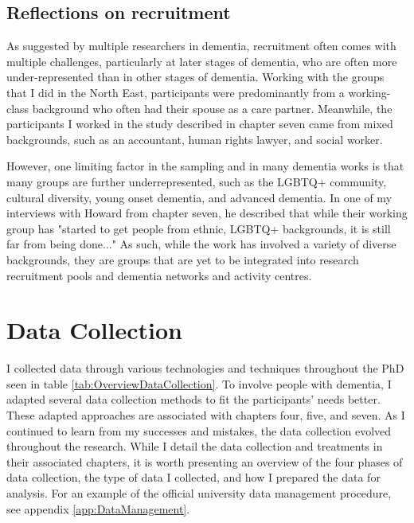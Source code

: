 \subsection{Reflections on recruitment}
As suggested by multiple researchers in dementia, recruitment often comes with multiple challenges, particularly at later stages of dementia, who are often more under-represented than in other stages of dementia. Working with the groups that I did in the North East, participants were predominantly from a working-class background who often had their spouse as a care partner. Meanwhile, the participants I worked in the study described in chapter seven came from mixed backgrounds, such as an accountant, human rights lawyer, and social worker. 

However, one limiting factor in the sampling and in many dementia works is that many groups are further underrepresented, such as the LGBTQ+ community, cultural diversity, young onset dementia, and advanced dementia. In one of my interviews with Howard from chapter seven, he described that while their working group has "started to get people from ethnic, LGBTQ+ backgrounds, it is still far from being done..." As such, while the work has involved a variety of diverse backgrounds, they are groups that are yet to be integrated into research recruitment pools and dementia networks and activity centres. 


\section{Data Collection}
\label{Method:DataCollection}
I collected data through various technologies and techniques throughout the PhD seen in table \ref{tab:OverviewDataCollection}. To involve people with dementia, I adapted several data collection methods to fit the participants' needs better. These adapted approaches are associated with chapters four, five, and seven. As I continued to learn from my successes and mistakes, the data collection evolved throughout the research. While I detail the data collection and treatments in their associated chapters, it is worth presenting an overview of the four phases of data collection, the type of data I collected, and how I prepared the data for analysis. For an example of the official university data management procedure, see appendix \ref{app:DataManagement}.

